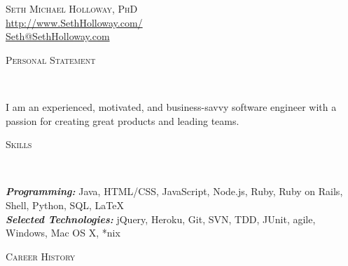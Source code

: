 \documentclass[9pt]{article}
\newenvironment{changemargin}[2]{%
  \begin{list}{}{%
    \setlength{\topsep}{0pt}%
    \setlength{\leftmargin}{#1}%
    \setlength{\rightmargin}{#2}%
    \setlength{\listparindent}{\parindent}%
    \setlength{\itemindent}{\parindent}%
    \setlength{\parsep}{\parskip}%
  }%
  \item[]}{\end{list}
}
\newcommand{\lineover}{
	\begin{changemargin}{-0.05in}{-0.05in}
		\vspace*{-8pt}
		\hrulefill \\
		\vspace*{-2pt}
	\end{changemargin}
}
\newcommand{\header}[1]{
	\begin{changemargin}{-0.5in}{-0.5in}
		\scshape{#1}\\
  	\lineover
	\end{changemargin}
}
\newcommand{\contact}[3]{
	\begin{changemargin}{-0.5in}{-0.5in}
		\begin{center}
			{\Large \scshape {#1}}\\ \smallskip
      {\url{#2}}\\ \smallskip 
      {\href{mailto:#3}{#3}}\\ \smallskip
		\end{center}
	\end{changemargin}
}
\newenvironment{body} {
	\vspace*{-16pt}
	\begin{changemargin}{-0.25in}{-0.5in}
  }	
	{\end{changemargin}
}
\begin{document}
\contact{Seth Michael Holloway, PhD}{http://www.SethHolloway.com/}{Seth@SethHolloway.com}


\header{Personal Statement}

\begin{body}
	\vspace{14pt}
  I am an experienced, motivated, and business-savvy software engineer with a passion for creating great products and leading teams.
\end{body}

\medskip


\header{Skills}

\begin{body}
	\vspace{14pt}
	\emph{\textbf{Programming:}}{} Java, HTML/CSS, JavaScript, Node.js, Ruby, Ruby on Rails, Shell, Python, SQL, \LaTeX\\
	\medskip
	\emph{\textbf{Selected Technologies:}}{} jQuery, Heroku, Git, SVN, TDD, JUnit, agile, Windows, Mac OS X, *nix\\
\end{body}

\medskip


\header{Career History}
\end{document}
